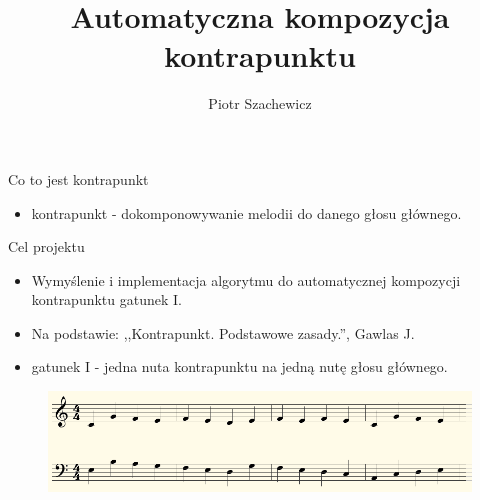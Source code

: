 \documentclass{beamer}
\title %
{Automatyczna kompozycja kontrapunktu}
\author %
{Piotr Szachewicz}
\begin{document}
\begin{frame}
  \titlepage
\end{frame}







\begin{frame}{Co to jest kontrapunkt}

  \begin{itemize}
  	\item kontrapunkt - dokomponowywanie melodii do danego głosu głównego.
  \end{itemize}
\end{frame}

\begin{frame}{Cel projektu}
	\begin{itemize}
		\item Wymyślenie i implementacja algorytmu do automatycznej kompozycji kontrapunktu gatunek I.
		\item Na podstawie: ,,Kontrapunkt. Podstawowe zasady.'', Gawlas J. 	
		\item gatunek I - jedna nuta kontrapunktu na jedną nutę głosu głównego.
	\end{itemize}

	\begin{figure}
	   \includegraphics[scale=0.3]{nuty.png}
	\end{figure}
\end{frame}
\end{document}
